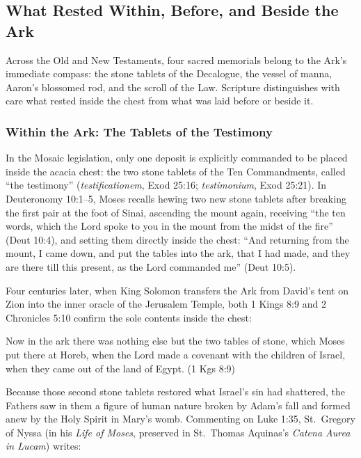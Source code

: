 \subsection{What Rested Within, Before, and Beside the Ark}
\label{subsec:contents-of-ark}

Across the Old and New Testaments, four sacred memorials belong to the Ark's immediate compass: the stone tablets of the Decalogue, the vessel of manna, Aaron's blossomed rod, and the scroll of the Law. Scripture distinguishes with care what rested inside the chest from what was laid before or beside it.

\subsubsection{Within the Ark: The Tablets of the Testimony}

In the Mosaic legislation, only one deposit is explicitly commanded to be placed inside the acacia chest: the two stone tablets of the Ten Commandments, called ``the testimony'' (\textit{testificationem}, Exod 25:16; \textit{testimonium}, Exod 25:21). In Deuteronomy 10:1--5, Moses recalls hewing two new stone tablets after breaking the first pair at the foot of Sinai, ascending the mount again, receiving ``the ten words, which the Lord spoke to you in the mount from the midst of the fire'' (Deut 10:4), and setting them directly inside the chest: ``And returning from the mount, I came down, and put the tables into the ark, that I had made, and they are there till this present, as the Lord commanded me'' (Deut 10:5).

Four centuries later, when King Solomon transfers the Ark from David's tent on Zion into the inner oracle of the Jerusalem Temple, both 1 Kings 8:9 and 2 Chronicles 5:10 confirm the sole contents inside the chest:

\begin{scriptureblock}
Now in the ark there was nothing else but the two tables of stone, which Moses put there at Horeb, when the Lord made a covenant with the children of Israel, when they came out of the land of Egypt. \textnormal{(1 Kgs 8:9)}
\end{scriptureblock}

Because those second stone tablets restored what Israel's sin had shattered, the Fathers saw in them a figure of human nature broken by Adam's fall and formed anew by the Holy Spirit in Mary's womb. Commenting on Luke 1:35, St.\ Gregory of Nyssa (in his \textit{Life of Moses}, preserved in St.\ Thomas Aquinas's \textit{Catena Aurea in Lucam}) writes:

